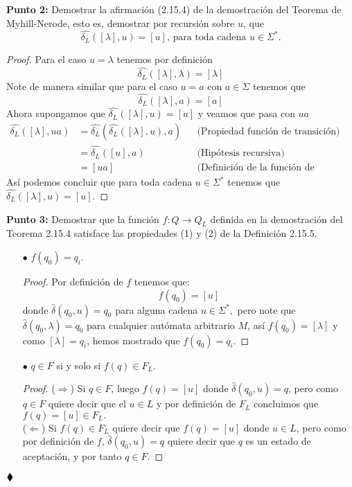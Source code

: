 \textbf{Punto 2: }Demostrar la afirmación (2.15.4) de la demostración del Teorema de Myhill-Nerode, esto es, demostrar por recursión sobre $u$, que
$$\widehat{\delta_L}([\lambda],u)=[u]\text{, para toda cadena }u\in\Sigma^*.$$
\begin{proof}
    Para el caso $u=\lambda$ tenemos por definición
    $$\widehat{\delta_L}([\lambda],\lambda)=[\lambda]$$
    Note de manera similar que para el caso $u=a$ con $a\in\Sigma$ tenemos que
    $$\widehat{\delta_L}([\lambda],a)=[a]$$
    Ahora supongamos que $\widehat{\delta_L}([\lambda],u)=[u]$ y veamos que pasa con $ua$
    \begin{align*}
       \widehat{\delta_L}([\lambda],ua)&=\widehat{\delta_L}(\widehat{\delta_L}([\lambda],u),a)&&\text{(Propiedad función de transición)}\\
       &=\widehat{\delta_L}([u],a)&&\text{(Hipótesis recursiva)} \\
       &=[ua]&&\text{(Definición de la función de transición).}
    \end{align*}
Así podemos concluir que para toda cadena $u\in\Sigma^*$ tenemos que $\widehat{\delta_L}([\lambda],u)=[u].$
\end{proof}
\textbf{Punto 3: }Demostrar que la función $f:Q\to Q_L$ definida en la demostración del Teorema 2.15.4 satisface las propiedades (1) y (2) de la Definición 2.15.5.
\begin{itemize}
    \item[$\bullet$]$f(q_0)=q_i.$
\begin{proof}
    Por definición de $f$ tenemos que:
    $$f(q_0)=[u]$$ 
    donde $\widehat{\delta}(q_0,u)=q_0$ para alguna cadena $u\in\Sigma^*,$ pero note que $\widehat{\delta}(q_0,\lambda)=q_0$ para cualquier autómata arbitrario $M$, así $f(q_0)=[\lambda]$ y como $[\lambda]=q_i$, hemos mostrado que $f(q_0)=q_i$. 
\end{proof}
    \item[$\bullet$]$q\in F$ si y solo si $f(q)\in F_L.$
    \begin{proof}
        ($\Rightarrow$) Si $q\in F$, luego $f(q)=[u]$ donde $\widehat{\delta}(q_0,u)=q$, pero como $q\in F$ quiere decir que el $u\in L$ y por definición de $F_L$ concluimos que $f(q)=[u]\in F_L.$\\
        ($\Leftarrow$) Si $f(q)\in F_L$ quiere decir que $f(q)=[u]$ donde $u\in L$, pero como por definición de $f$, $\widehat{\delta}(q_0,u)=q$ quiere decir que $q$ es un estado de aceptación, y por tanto $q\in F.$
    \end{proof}
\end{itemize}
$\hfill \blacklozenge$